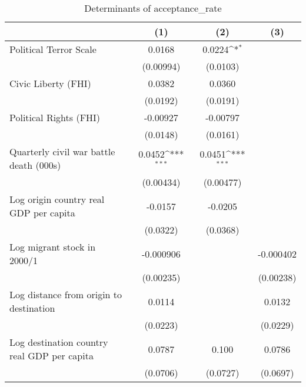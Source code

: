 \begin{table}[htbp]\centering
\def\sym#1{\ifmmode^{#1}\else\(^{#1}\)\fi}
\caption{Determinants of acceptance\_rate}
\begin{tabular}{l*{3}{c}}
\hline\hline
                    &\multicolumn{1}{c}{(1)}         &\multicolumn{1}{c}{(2)}         &\multicolumn{1}{c}{(3)}         \\
\hline
Political Terror Scale&      0.0168         &      0.0224\sym{*}  &                     \\
                    &   (0.00994)         &    (0.0103)         &                     \\
[1em]
Civic Liberty (FHI) &      0.0382         &      0.0360         &                     \\
                    &    (0.0192)         &    (0.0191)         &                     \\
[1em]
Political Rights (FHI)&    -0.00927         &    -0.00797         &                     \\
                    &    (0.0148)         &    (0.0161)         &                     \\
[1em]
Quarterly civil war battle death (000s)&      0.0452\sym{***}&      0.0451\sym{***}&                     \\
                    &   (0.00434)         &   (0.00477)         &                     \\
[1em]
Log origin country real GDP per capita&     -0.0157         &     -0.0205         &                     \\
                    &    (0.0322)         &    (0.0368)         &                     \\
[1em]
Log migrant stock in 2000/1&   -0.000906         &                     &   -0.000402         \\
                    &   (0.00235)         &                     &   (0.00238)         \\
[1em]
Log distance from origin to destination&      0.0114         &                     &      0.0132         \\
                    &    (0.0223)         &                     &    (0.0229)         \\
[1em]
Log destination country real GDP per capita&      0.0787         &       0.100         &      0.0786         \\
                    &    (0.0706)         &    (0.0727)         &    (0.0697)         \\

\end{tabular}
\end{table}
